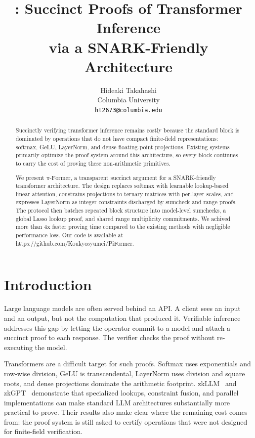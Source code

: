 \documentclass[letterpaper,twocolumn,10pt]{article}
\date{}
\title{\Large \bf \sys{}: Succinct Proofs of Transformer Inference\\
       via a SNARK-Friendly Architecture}
\author{
{\rm Hideaki Takahashi}\\
Columbia University\\
\texttt{ht2673@columbia.edu}
}
\theoremstyle{remark}
\theoremstyle{definition}
\newcommand{\sys}{\ensuremath{\pi\text{-Former}}}
\begin{document}
\maketitle

\begin{abstract}
Succinctly verifying transformer inference remains costly because
the standard block is dominated by operations that do not have compact
finite-field representations: softmax, GeLU, LayerNorm, and dense
floating-point projections. Existing systems primarily optimize the
proof system around this architecture, so every block continues to
carry the cost of proving these non-arithmetic primitives.

We present \sys{}, a transparent succinct argument for a
SNARK-friendly transformer architecture. The design replaces softmax
with learnable lookup-based linear attention, constrains projections
to ternary matrices with per-layer scales, and expresses LayerNorm as
integer constraints discharged by sumcheck and range proofs. The
protocol then batches repeated block structure into model-level
sumchecks, a global Lasso lookup proof, and shared range
multiplicity commitments. We achived more than 4x faster proving time compared to the existing methods with negligible performance loss. Our code is available at https://github.com/Koukyosyumei/PiFormer.
\end{abstract}

\makeatother

\section{Introduction}
\label{sec:intro}

Large language models are often served behind an API. A client sees
an input and an output, but not the computation that produced it.
Verifiable inference~\cite{liu2021zkcnn,sun2024zkllm,qu2025zkgpt,abbaszadeh2024zero}
addresses this gap by letting the operator commit to a model and
attach a succinct proof to each response. The verifier checks the
proof without re-executing the model.

Transformers are a difficult target for such proofs. Softmax uses
exponentials and row-wise division, GeLU is transcendental, LayerNorm
uses division and square roots, and dense projections dominate the
arithmetic footprint. zkLLM~\cite{sun2024zkllm} and
zkGPT~\cite{qu2025zkgpt} demonstrate that specialized lookups,
constraint fusion, and parallel implementations can make standard LLM
architectures substantially more practical to prove. Their results
also make clear where the remaining cost comes from: the proof system
is still asked to certify operations that were not designed for
finite-field verification.
\end{document}
